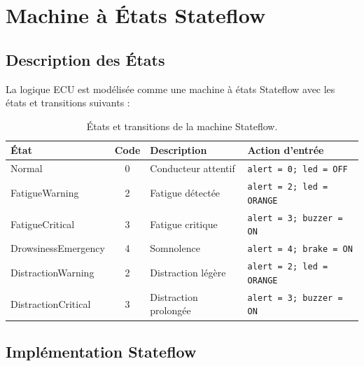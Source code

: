 \documentclass[12pt,a4paper,twoside]{report}
\begin{document}
\section{Machine à États Stateflow}

\subsection{Description des États}

La logique ECU est modélisée comme une machine à états Stateflow avec les états et transitions suivants :

\begin{table}[H]
\centering
\caption{États et transitions de la machine Stateflow.}
\label{tab:stateflow_states}
\renewcommand{\arraystretch}{1.4}
\begin{tabularx}{\textwidth}{|l|c|X|X|}
\hline
\rowcolor{stellantisblue!15}
\textbf{État} & \textbf{Code} & \textbf{Description} & \textbf{Action d'entrée} \\
\hline
Normal & 0 & Conducteur attentif & \texttt{alert = 0; led = OFF} \\
\hline
\cellcolor{alertyellow!20} FatigueWarning & 2 & Fatigue détectée & \texttt{alert = 2; led = ORANGE} \\
\hline
\cellcolor{alertorange!20} FatigueCritical & 3 & Fatigue critique & \texttt{alert = 3; buzzer = ON} \\
\hline
\cellcolor{alertred!20} DrowsinessEmergency & 4 & Somnolence & \texttt{alert = 4; brake = ON} \\
\hline
\cellcolor{alertyellow!20} DistractionWarning & 2 & Distraction légère & \texttt{alert = 2; led = ORANGE} \\
\hline
\cellcolor{alertorange!20} DistractionCritical & 3 & Distraction prolongée & \texttt{alert = 3; buzzer = ON} \\
\hline
\end{tabularx}
\end{table}

\subsection{Implémentation Stateflow}
\end{document}
